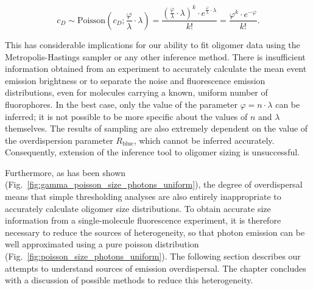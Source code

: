 \begin{equation}
c_D \sim \text{Poisson}(c_D; \frac{\varphi}{\lambda} \cdot \lambda) = \frac{(\frac{\varphi}{\lambda} \cdot \lambda)^k \cdot e^{\frac{\varphi}{\lambda} \cdot \lambda}}{k!} = \frac{\varphi^{k} \cdot e^{-\varphi}}{k!}.
\label{eq:n_photons_2}
\end{equation}  

This has considerable implications for our ability to fit oligomer data using the Metropolis-Hastings sampler or any other inference method. There is insufficient information obtained from an experiment to accurately calculate the mean event emission brightness or to separate the noise and fluorescence emission distributions, even for molecules carrying a known, uniform number of fluorophores. In the best case, only the value of the parameter $\varphi = n \cdot \lambda$ can be inferred; it is not possible to be more specific about the values of $n$ and $\lambda$ themselves. The results of sampling are also extremely dependent on the value of the overdispersion parameter $R_{\text{blue}}$, which cannot be inferred accurately. Consequently, extension of the inference tool to oligomer sizing is unsuccessful. 

Furthermore, as has been shown (Fig.~\ref{fig:gamma_poisson_size_photons_uniform}), the degree of overdispersal means that simple thresholding analyses are also entirely inappropriate to accurately calculate oligomer size distributions. To obtain accurate size information from a single-molecule fluorescence experiment, it is therefore necessary to reduce the sources of heterogeneity, so that photon emission can be well approximated using a pure poisson distribution (Fig.~\ref{fig:poisson_size_photons_uniform}). The following section describes our attempts to understand sources of emission overdispersal. The chapter concludes with a discussion of possible methods to reduce this heterogeneity.   

